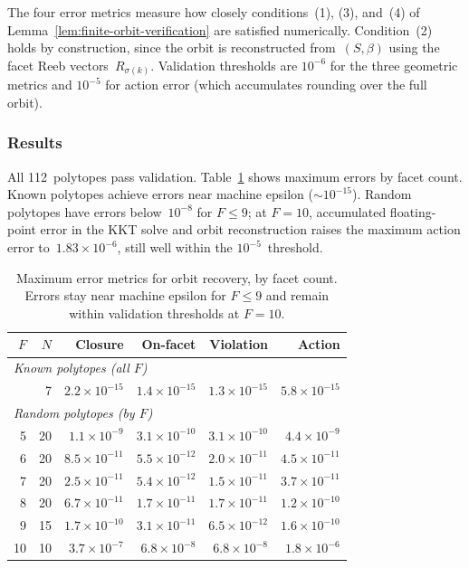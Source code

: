 The four error metrics measure how closely conditions~(1), (3),
and~(4) of Lemma~\ref{lem:finite-orbit-verification} are satisfied
numerically. Condition~(2) holds by construction, since the orbit is
reconstructed from~$(S, \beta)$ using the facet Reeb
vectors~$R_{\sigma(k)}$.
Validation thresholds are $10^{-6}$ for the three geometric metrics and
$10^{-5}$ for action error (which accumulates rounding over the full
orbit).

\subsubsection*{Results}

All 112~polytopes pass validation.
Table~\ref{tab:orbit-recovery-errors} shows maximum errors by facet
count. Known polytopes achieve errors near machine epsilon (${\sim}10^{-15}$).
Random polytopes have errors below~$10^{-8}$ for $F \le 9$; at
$F = 10$, accumulated floating-point error in the KKT solve and orbit
reconstruction raises the maximum action error to~$1.83 \times 10^{-6}$,
still well within the $10^{-5}$~threshold.

\begin{table}[h]
\centering
\small
\begin{tabular}{rrrrrr}
\toprule
$F$ & $N$ & Closure & On-facet & Violation & Action \\
\midrule
\multicolumn{6}{l}{\emph{Known polytopes (all $F$)}} \\
 & 7 & $2.2 \times 10^{-15}$ & $1.4 \times 10^{-15}$ & $1.3 \times 10^{-15}$ & $5.8 \times 10^{-15}$ \\
\midrule
\multicolumn{6}{l}{\emph{Random polytopes (by $F$)}} \\
5 & 20 & $1.1 \times 10^{-9}$ & $3.1 \times 10^{-10}$ & $3.1 \times 10^{-10}$ & $4.4 \times 10^{-9}$ \\
6 & 20 & $8.5 \times 10^{-11}$ & $5.5 \times 10^{-12}$ & $2.0 \times 10^{-11}$ & $4.5 \times 10^{-11}$ \\
7 & 20 & $2.5 \times 10^{-11}$ & $5.4 \times 10^{-12}$ & $1.5 \times 10^{-11}$ & $3.7 \times 10^{-11}$ \\
8 & 20 & $6.7 \times 10^{-11}$ & $1.7 \times 10^{-11}$ & $1.7 \times 10^{-11}$ & $1.2 \times 10^{-10}$ \\
9 & 15 & $1.7 \times 10^{-10}$ & $3.1 \times 10^{-11}$ & $6.5 \times 10^{-12}$ & $1.6 \times 10^{-10}$ \\
10 & 10 & $3.7 \times 10^{-7}$ & $6.8 \times 10^{-8}$ & $6.8 \times 10^{-8}$ & $1.8 \times 10^{-6}$ \\
\bottomrule
\end{tabular}
\caption{Maximum error metrics for orbit recovery, by facet count.
  Errors stay near machine epsilon for $F \le 9$ and remain within
  validation thresholds at $F = 10$.}
\label{tab:orbit-recovery-errors}
\end{table}

